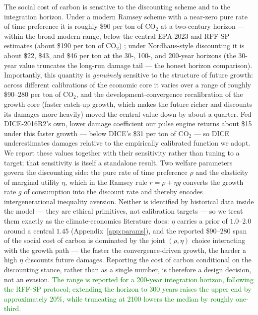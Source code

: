 \documentclass[a4paper,fleqn]{cas-sc}
\begin{document}
The social cost of carbon is sensitive to the discounting scheme and to the integration horizon.
Under a modern Ramsey scheme with a near-zero pure rate of time preference it is roughly \$90 per
ton of CO${}_2$ at a two-century horizon --- within the broad modern range, below the central
EPA-2023 and RFF-SP estimates (about \$190 per ton of CO${}_2$) \citep{rennert2022,epa2023}; under
Nordhaus-style discounting it is about \$22, \$43, and \$46 per ton at the 30-, 100-, and 200-year
horizons (the 30-year value truncates the long-run damage tail --- the honest horizon comparison).
Importantly, this quantity is \emph{genuinely} sensitive to the structure of future growth: across
different calibrations of the economic core it varies over a range of roughly \$90--280 per ton of
CO${}_2$, and the development-convergence recalibration of the growth core (faster catch-up growth,
which makes the future richer and discounts its damages more heavily) moved the central value down
by about a quarter. Fed DICE-2016R2's own, lower damage coefficient our pulse engine returns about
\$15 under this faster growth --- below DICE's \$31 per ton of CO${}_2$ --- so DICE underestimates
damages relative to the empirically calibrated function we adopt. We report these values together
with their sensitivity rather than tuning to a target; that sensitivity is itself a standalone
result. Two welfare parameters govern the discounting side: the pure rate of time preference
$\rho$ and the elasticity of marginal utility $\eta$, which in the Ramsey rule
$r = \rho + \eta g$ converts the growth rate $g$ of consumption into the discount rate and thereby
encodes intergenerational inequality aversion. Neither is identified by historical data inside the
model --- they are ethical primitives, not calibration targets --- so we treat them exactly as the
climate-economics literature does: $\eta$ carries a prior of $1.0$--$2.0$ around a central $1.45$
(Appendix~\ref{app:params}), and the reported \$$90$--$280$ span of the social cost of carbon is
dominated by the joint $(\rho,\eta)$ choice interacting with the growth path --- the faster the
convergence-driven growth, the harder a high $\eta$ discounts future damages. Reporting the cost
of carbon conditional on the discounting stance, rather than as a single number, is therefore a design decision, not an evasion. \textcolor{green}{The range is reported for a 200-year integration horizon, following the RFF-SP protocol; extending the horizon to 300 years raises the upper end by approximately 20\%, while truncating at 2100 lowers the median by roughly one-third.}
\end{document}
